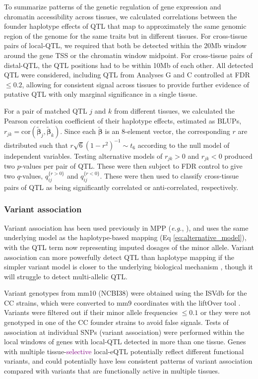 \documentclass[10pt,letterpaper]{article}
\newcommand{\eg}{\emph{e.g.}\xspace}
\newcommand{\bbeta}{\boldsymbol{\beta}}
\newcommand{\blup}{\widetilde{\bbeta}}
\newcommand{\TFinline}[1]{\textcolor{purple}{#1}}
\begin{document}
To summarize patterns of the genetic regulation of gene expression and chromatin accessibility across tissues, we calculated correlations between the founder haplotype effects of QTL that map to approximately the same genomic region of the genome for the same traits but in different tissues. For cross-tissue pairs of local-QTL, we required that both be detected within the 20Mb window around the gene TSS or the chromatin window midpoint. For cross-tissue pairs of distal-QTL, the QTL positions had to be within 10Mb of each other. All detected QTL were considered, including QTL from Analyses G and C controlled at FDR $\le 0.2$, allowing for consistent signal across tissues to provide further evidence of putative QTL with only marginal significance in a single tissue.

For a pair of matched QTL $j$ and $k$ from different tissues, we calculated the Pearson correlation coefficient of their haplotype effects, estimated as BLUPs, $r_{jk} = \text{cor}(\blup_j, \blup_k)$. Since each $\blup$ is an 8-element vector, the corresponding $r$ are distributed such that $r\sqrt{6}(1 - r^{2})^{-1} \sim t_{6}$ according to the null model of independent variables. Testing alternative models of $r_{jk} > 0$ and $r_{jk} < 0$ produced two $p$-values per pair of QTL. These were then subject to FDR control \cite{Benjamini1995} to give two $q$-values, $q_{ij}^{\{r > 0\}}$ and $q_{ij}^{\{r < 0\}}$. These were then used to classify cross-tissue pairs of QTL as being significantly correlated or anti-correlated, respectively. 

\subsubsection*{Variant association}

Variant association has been used previously in MPP (\eg, \cite{Baud2014, Keele2018}), and uses the same underlying model as the haplotype-based mapping (Eq \ref{eq:alternative_model}), with the QTL term now representing imputed dosages of the minor allele. Variant association can more powerfully detect QTL than haplotype mapping if the simpler variant model is closer to the underlying biological mechanism \cite{Yalcin2005}, though it will struggle to detect multi-allelic QTL.

Variant genotypes from mm10 (NCBI38) were obtained using the ISVdb \cite{Oreper2017} for the CC strains, which were converted to mm9 coordinates with the liftOver tool \cite{Lawrence2009}. Variants were filtered out if their minor allele frequencies $\le 0.1$ or they were not genotyped in one of the CC founder strains to avoid false signals.
Tests of association at individual SNPs (variant association) were performed within the local windows of genes with local-QTL detected in more than one tissue. 
Genes with multiple tissue-\TFinline{selective} local-eQTL potentially reflect different functional variants, and could potentially have less consistent patterns of variant association compared with variants that are functionally active in multiple tissues.
\end{document}

